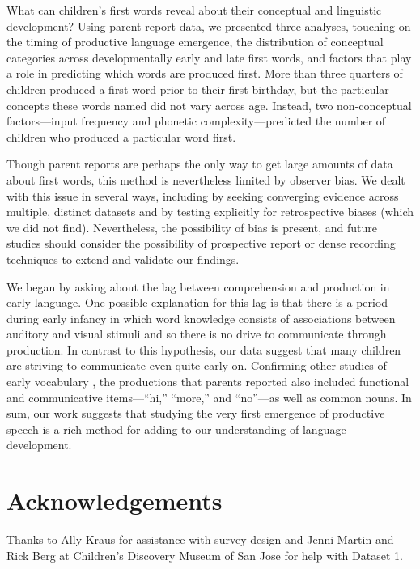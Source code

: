 \documentclass[10pt,letterpaper]{article}
\begin{document}
What can children's first words reveal about their conceptual and linguistic development? Using parent report data, we presented three analyses, touching on the timing of productive language emergence, the distribution of conceptual categories across developmentally early and late first words, and factors that play a role in predicting which words are produced first. More than three quarters of children produced a first word prior to their first birthday, but the particular concepts these words named did not vary across age. Instead, two non-conceptual factors---input frequency and phonetic complexity---predicted the number of children who produced a particular word first.

Though parent reports are perhaps the only way to get large amounts of data about first words, this method is nevertheless limited by observer bias. We dealt with this issue in several ways, including by seeking converging evidence across multiple, distinct datasets and by testing explicitly for retrospective biases (which we did not find). Nevertheless, the possibility of bias is present, and future studies should consider the possibility of prospective report or dense recording techniques to extend and validate our findings. 

We began by asking about the lag between comprehension and production in early language. One possible explanation for this lag is that there is a period during early infancy in which word knowledge consists of associations between auditory and visual stimuli and so there is no drive to communicate through production. In contrast to this hypothesis, our data suggest that many children are striving to communicate even quite early on. Confirming other studies of early vocabulary \cite{tardif2007}, the productions that parents reported also included functional and communicative items---``hi,'' ``more,'' and ``no''---as well as common nouns. In sum, our work suggests that studying the very first emergence of productive speech is a rich method for adding to our understanding of language development.

\section{Acknowledgements}

Thanks to Ally Kraus for assistance with survey design and Jenni Martin and Rick Berg at Children's Discovery Museum of San Jose for help with Dataset 1.



\setlength{\bibleftmargin}{.125in}
\setlength{\bibindent}{-\bibleftmargin}


\end{document}
